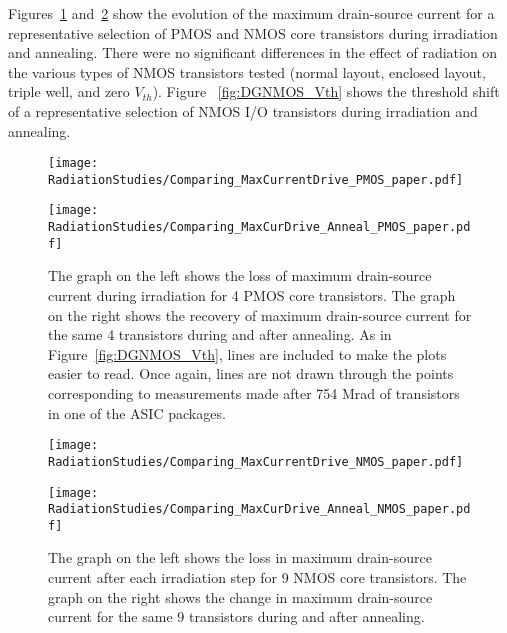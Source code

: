 Figures~\ref{fig:MaxCurDrive_PMOS} and~\ref{fig:MaxCurDrive_NMOS} show the evolution of the maximum drain-source current for a representative selection of PMOS and NMOS core transistors during irradiation and annealing. There were no significant differences in the effect of radiation on the various types of NMOS transistors tested (normal layout, enclosed layout, triple well, and zero $V_{th}$). Figure ~\ref{fig:DGNMOS_Vth} shows the threshold shift of a representative selection of NMOS I/O transistors during irradiation and annealing.

\begin{figure}[htb!]
\begin{minipage}[b]{0.5\textwidth}
	\centering
	\texttt{[image: RadiationStudies/Comparing\_MaxCurrentDrive\_PMOS\_paper.pdf]}
\end{minipage}
\hspace{0.5cm}
\begin{minipage}[b]{0.5\textwidth}
	\centering
	\texttt{[image: RadiationStudies/Comparing\_MaxCurDrive\_Anneal\_PMOS\_paper.pdf]}
\end{minipage}
\caption{The graph on the left shows the loss of maximum drain-source current during irradiation for 4 PMOS core transistors. The graph on the right shows the recovery of maximum drain-source current for the same 4 transistors during and after annealing.
As in Figure~\ref{fig:DGNMOS_Vth}, lines are included to make the plots easier to read.
Once again, lines are not drawn through the points corresponding to measurements made after 754 Mrad of transistors in one of the ASIC packages.}
\label{fig:MaxCurDrive_PMOS}
\end{figure}

\begin{figure}[htb!]
\begin{minipage}[b]{0.5\textwidth}
	\centering
	\texttt{[image: RadiationStudies/Comparing\_MaxCurrentDrive\_NMOS\_paper.pdf]}
\end{minipage}
\hspace{0.5cm}
\begin{minipage}[b]{0.5\textwidth}
	\centering
	\texttt{[image: RadiationStudies/Comparing\_MaxCurDrive\_Anneal\_NMOS\_paper.pdf]}
\end{minipage}
\caption{The graph on the left shows the loss in maximum drain-source current after each irradiation step for 9 NMOS core transistors. The graph on the right shows the change in maximum drain-source current for the same 9 transistors during and after annealing.}
\label{fig:MaxCurDrive_NMOS}
\end{figure}

